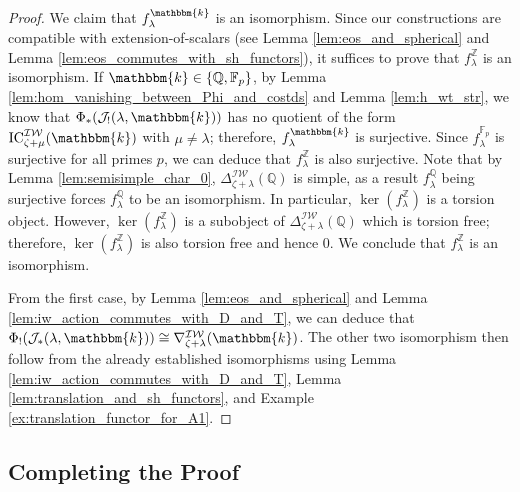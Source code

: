 \documentclass{amsart}
\newcommand{\Q}{\mathbb{Q}}
\newcommand{\Z}{\mathbb{Z}}
\newcommand{\F}{\mathbb{F}}
\renewcommand{\k}{\mathbbm{k}}
\newcommand{\scrJ}{\mathcal{J}}
\newcommand{\IW}{\mathcal{IW}}
\DeclareMathOperator{\IC}{IC}
\theoremstyle{definition}
\begin{document}
\begin{proof}
        We claim that $f_{\lambda}^{\k}$ is an isomorphism.
        Since our constructions are compatible with extension-of-scalars (see Lemma \ref{lem:eos_and_spherical} and Lemma \ref{lem:eos_commutes_with_sh_functors}), it suffices to prove that $f_{\lambda}^{\Z}$ is an isomorphism.
        If $\k \in \{\Q, \F_p\}$, by Lemma \ref{lem:hom_vanishing_between_Phi_and_costds} and Lemma \ref{lem:h_wt_str}, we know that $\Phi_* (\scrJ_! (\lambda, \k))$ has no quotient of the form $\IC_{\zeta + \mu}^{\IW} (\k)$ with $\mu \neq \lambda$; therefore, $f_{\lambda}^{\k}$ is surjective.
        Since $f_{\lambda}^{\F_p}$ is surjective for all primes $p$, we can deduce that $f_{\lambda}^{\Z}$ is also surjective.
        Note that by Lemma \ref{lem:semisimple_char_0}, $\Delta_{\zeta + \lambda}^{\IW} (\Q)$ is simple, as a result $f_{\lambda}^{\Q}$ being surjective forces $f_{\lambda}^{\Q}$ to be an isomorphism.
        In particular, $\ker (f_{\lambda}^{\Z})$ is a torsion object.
        However, $\ker (f_{\lambda}^{\Z})$ is a subobject of $\Delta_{\zeta + \lambda}^{\IW} (\Q)$ which is torsion free; therefore, $\ker (f_{\lambda}^{\Z})$ is also torsion free and hence $0$.
        We conclude that $f_{\lambda}^{\Z}$ is an isomorphism. 

        From the first case, by Lemma \ref{lem:eos_and_spherical} and Lemma \ref{lem:iw_action_commutes_with_D_and_T}, we can deduce that $\Phi_! (\scrJ_* (\lambda, \k)) \cong \nabla_{\zeta + \lambda}^{\IW} (\k)$.
        The other two isomorphism then follow from the already established isomorphisms using  Lemma \ref{lem:iw_action_commutes_with_D_and_T}, Lemma \ref{lem:translation_and_sh_functors}, and Example \ref{ex:translation_functor_for_A1}.
    \end{proof}

    \subsection{Completing the Proof}\quad
\end{document}
